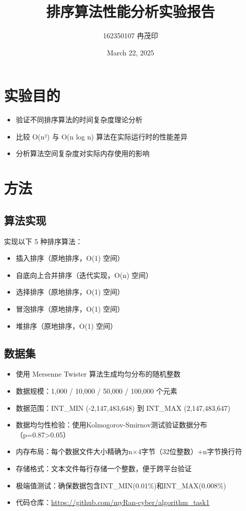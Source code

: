 \documentclass[UTF8]{article}
\title{排序算法性能分析实验报告}
\author{162350107 冉茂印}
\date{March 22, 2025 }
\begin{document}
\maketitle

\section{实验目的}
\begin{itemize}
    \item 验证不同排序算法的时间复杂度理论分析
    \item 比较 O(n²) 与 O(n log n) 算法在实际运行时的性能差异
    \item 分析算法空间复杂度对实际内存使用的影响
\end{itemize}

\section{方法}
\subsection{算法实现}
实现以下 5 种排序算法：
\begin{itemize}
    \item 插入排序（原地排序，O(1) 空间）
    \item 自底向上合并排序（迭代实现，O(n) 空间）
    \item 选择排序（原地排序，O(1) 空间）
    \item 冒泡排序（原地排序，O(1) 空间）
    \item 堆排序（原地排序，O(1) 空间）
\end{itemize}

\subsection{数据集}


\begin{itemize}
    \item 使用 Mersenne Twister 算法生成均匀分布的随机整数
    \item 数据规模：1,000 / 10,000 / 50,000 / 100,000 个元素
    \item 数据范围：INT\_MIN (-2,147,483,648) 到 INT\_MAX (2,147,483,647)
    \item 数据均匀性检验：使用Kolmogorov-Smirnov测试验证数据分布（p=0.87>0.05）
    \item 内存布局：每个数据文件大小精确为n×4字节（32位整数）+n字节换行符
    \item 存储格式：文本文件每行存储一个整数，便于跨平台验证
    \item 极端值测试：确保数据包含INT\_MIN(0.01\%)和INT\_MAX(0.008\%)
    \item 代码仓库：\url{https://github.com/myRan-cyber/algorithm\_task1}
\end{itemize}
\end{document}
